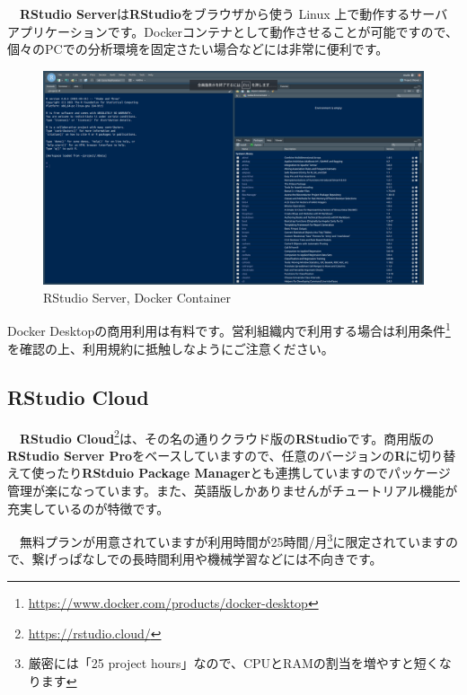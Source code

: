 \documentclass[
  12pt,
]{book}
\DeclareRobustCommand{\href}[2]{#2\footnote{\url{#1}}}
\begin{document}
　\textbf{RStudio Server}は\textbf{RStudio}をブラウザから使う Linux 上で動作するサーバアプリケーションです。Dockerコンテナとして動作させることが可能ですので、個々のPCでの分析環境を固定さたい場合などには非常に便利です。

\begin{figure}[H]

{\centering \includegraphics[width=0.9\linewidth,]{./fig/RStudio/RStudioServer} 

}

\caption{RStudio Server, Docker Container}\label{fig:unnamed-chunk-24}
\end{figure}

\begin{hint-box}
Docker Desktopの商用利用は有料です。営利組織内で利用する場合は\href{https://www.docker.com/products/docker-desktop}{利用条件}を確認の上、利用規約に抵触しなようにご注意ください。

\end{hint-box}

\hypertarget{rstudio-cloud}{%
\subsection{\texorpdfstring{RStudio Cloud}{RStudio Cloud}}\label{rstudio-cloud}}

　\href{https://rstudio.cloud/}{\textbf{RStudio Cloud}}は、その名の通りクラウド版の\textbf{RStudio}です。商用版の\textbf{RStudio Server Pro}をベースしていますので、任意のバージョンの\textbf{R}に切り替えて使ったり\textbf{RStduio Package Manager}とも連携していますのでパッケージ管理が楽になっています。また、英語版しかありませんがチュートリアル機能が充実しているのが特徴です。

　無料プランが用意されていますが利用時間が25時間/月\footnote{厳密には「25 project hours」なので、CPUとRAMの割当を増やすと短くなります}に限定されていますので、繋げっぱなしでの長時間利用や機械学習などには不向きです。
\end{document}
